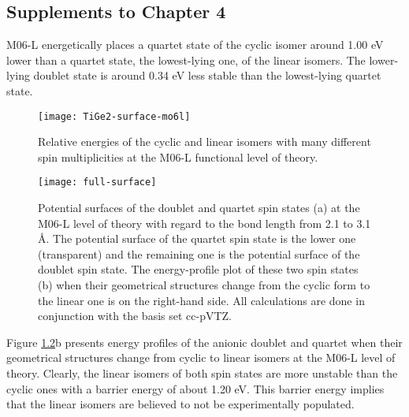 \begin{refsection}

\chapter{Supplements to Chapter 4}\label{appendix:a4}




M06-L energetically places a quartet state of the cyclic isomer around 1.00 eV lower than a quartet state, the lowest-lying one, of the linear isomers. The lower-lying doublet state is around 0.34 eV less stable than the lowest-lying quartet state.




\begin{figure}[htb!]
	\centering
	\texttt{[image: TiGe2-surface-mo6l]}
	\caption{Relative energies of the cyclic and linear isomers with many different spin multiplicities at the M06-L functional level of theory.}
	\label{a4fig:RE-linear-cyclic}
\end{figure}






\begin{figure}[htb!]
	\centering
	\texttt{[image: full-surface]}
	\caption{Potential surfaces of the doublet and quartet spin states (a) at the M06-L level of theory with regard to the  bond length from 2.1 to 3.1 \AA. The potential surface of the quartet spin state is the lower one (transparent) and the remaining one is the potential surface of the doublet spin state. The energy-profile plot of these two spin states (b) when their geometrical structures change from the cyclic form to the linear one is on the right-hand side. All calculations are done in conjunction with the basis set cc-pVTZ.}
	\label{a4fig:full-surface}
\end{figure}




Figure \ref{a4fig:full-surface}b presents energy profiles of the anionic doublet and quartet when their geometrical structures change from cyclic to linear isomers at the M06-L level of theory. Clearly, the linear isomers of both spin states are more unstable than the cyclic ones with a barrier energy of about 1.20 eV. This barrier energy implies that the linear isomers are believed to not be experimentally populated.











\cleardoublepage

\printbibliography[heading=subbibliography] %

\end{refsection}